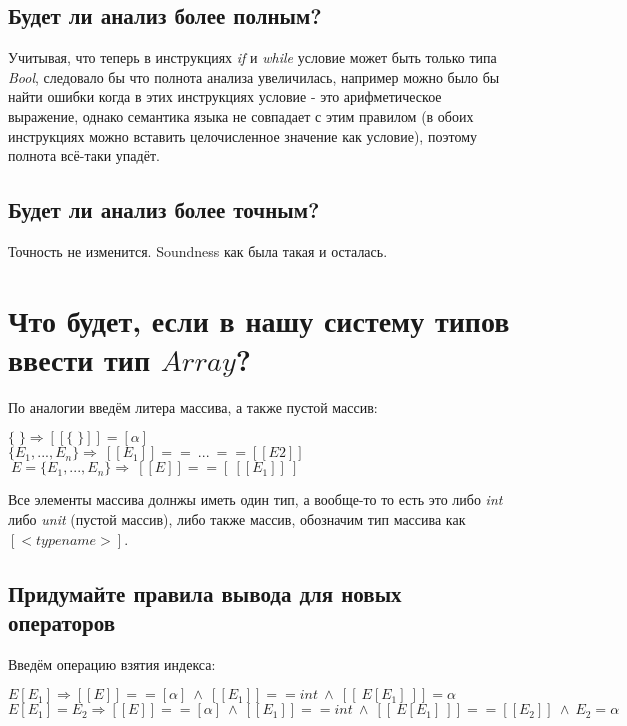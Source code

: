 \documentclass{report}
\begin{document}
\subsection{Будет ли анализ более полным?}

Учитывая, что теперь в инструкциях \textit{if} и \textit{while} условие может быть только типа \textit{Bool}, следовало бы что полнота анализа увеличилась, например можно было бы найти ошибки когда в этих инструкциях условие - это арифметическое выражение, однако семантика языка не совпадает с этим правилом (в обоих инструкциях можно вставить целочисленное значение как условие), поэтому полнота всё-таки упадёт.

\subsection{Будет ли анализ более точным?}

Точность не изменится. Soundness как была такая и осталась.

\section{Что будет, если в нашу систему типов ввести тип \(Array\)?}

По аналогии введём литера массива, а также пустой массив:

\begin{center}
    \(\{ \; \} \Rightarrow [[\{ \; \}]] = [\alpha]\) \\
    \(\{E_1,...,E_n\} \Rightarrow \ [[E_1]] == \ ... \  == [[E2]] \) \\
    \(\ E = \{E_1,...,E_n\} \Rightarrow \ [[E]] == [ \ [[E_1]] \ ] \)
\end{center}

Все элементы массива долнжы иметь один тип, а вообще-то то есть это либо \textit{int} либо \textit{unit} (пустой массив), либо также массив, обозначим тип массива как \([<typename>] \).

\subsection{Придумайте правила вывода для новых операторов}
Введём операцию взятия индекса:

\begin{center}
    \( E[E_1] \Rightarrow [[E]] == [\alpha] \ \wedge \ [[E_1]] == int \ \wedge \ [[ \ E[E_1]\  ]] = \alpha\) \\
    \( E[E_1] = E_2 \Rightarrow [[E]] == [\alpha] \ \wedge \ [[E_1]] == int \ \wedge \ [[ \ E[E_1] \ ]] == [[E_2]] \  \wedge \ E_2 = \alpha\) \\
\end{center}
\end{document}
